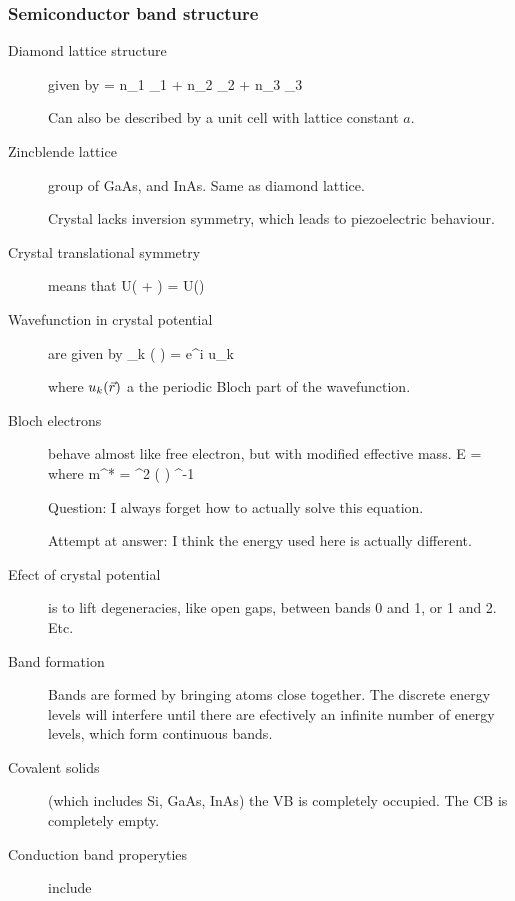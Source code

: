 \subsubsection{Semiconductor band structure}
\begin{description}
\item[Diamond lattice structure] given by 
\beq
{} = n_1 _1  + n_2 _2 + n_3 _3
\eeq

Can also be described by a unit cell with lattice constant $a$. 

\item[Zincblende lattice] group of GaAs, and InAs. Same as diamond lattice. 

Crystal lacks inversion symmetry, which leads to piezoelectric behaviour. 

\item[Crystal translational symmetry] means that
\beq
U( + ) = U()
\eeq

\item[Wavefunction in crystal potential] are given by 
\beq
\psi_k ( ) = e^{i  \cdot {} } u_k
\eeq

where $u_k(\vec{r})$ a the periodic Bloch part of the wavefunction. 

\item[Bloch electrons] behave almost like free electron, but with modified effective mass. 
\beq
E = 
\eeq
where
\beq
m^* = \hbar^2 \left( \right) ^{-1}
\eeq


Question: I always forget how to actually solve this equation. 

Attempt at answer:  I think the energy used here is actually different. 

\item[Efect of crystal potential] is to lift degeneracies, like open gaps, between bands 0 and 1, or 1 and 2. Etc. 


\item[Band formation] Bands are formed by bringing atoms close together. The discrete energy levels will interfere until there are efectively an infinite number of energy levels, which form continuous bands.

\item[Covalent solids] (which includes Si, GaAs, InAs) the VB is completely occupied. 	The CB 	is completely empty. 

\item[Conduction band properyties] include


\end{description}
